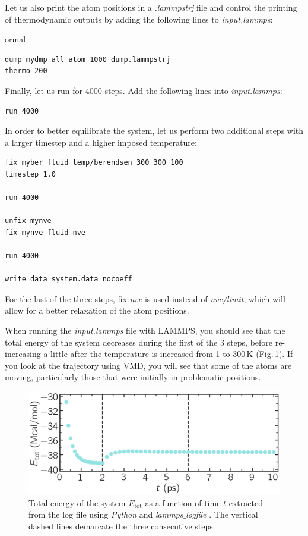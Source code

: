 \documentclass[9pt,tutorial]{livecoms}
\begin{document}
Let us also print the atom positions in a \textit{.lammpstrj} file and control the printing of thermodynamic outputs by adding the following lines to \textit{input.lammps}:
{
ormal \begin{verbatim}
dump mydmp all atom 1000 dump.lammpstrj
thermo 200
\end{verbatim}}
Finally, let us run for 4000 steps. Add the following lines into \textit{input.lammps}:
{\normalsize \begin{verbatim}
run 4000
\end{verbatim}}
In order to better equilibrate the system, let us perform two additional steps with a larger timestep and a higher imposed temperature:
{\normalsize \begin{verbatim}
fix myber fluid temp/berendsen 300 300 100
timestep 1.0

run 4000

unfix mynve
fix mynve fluid nve

run 4000

write_data system.data nocoeff
\end{verbatim}}
For the last of the three steps, fix \textit{nve} is used instead of \textit{nve/limit}, which will allow for a better relaxation of the atom positions. 

When running the \textit{input.lammps} file with LAMMPS, you should see that the total energy of the system decreases during the first of the 3 steps, before re-increasing a little after the temperature is increased from 1 to $300\,\text{K}$ (Fig.\,\ref{fig:NANOSHEAR-minimization}). If you look at the trajectory using VMD, you will see that some of the atoms are moving, particularly those that were initially in problematic positions. 

\begin{figure}
\centering
\includegraphics[width=\linewidth]{NANOSHEAR-minimization}
\caption{Total energy of the system $E_\text{tot}$ as a function of time $t$ extracted from the log file using \textit{Python} and \textit{lammps$\_$logfile} \cite{sveinsson2021logfile}. The vertical dashed lines demarcate the three consecutive steps.}
\label{fig:NANOSHEAR-minimization}
\end{figure}
\end{document}
